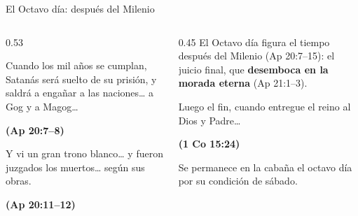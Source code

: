 \documentclass[hyperref={bookmarks=false},aspectratio=169]{beamer}
\newcommand{\fuente}[1]{\par\hfill{\upshape\bfseries\footnotesize\textcolor{tierraroja}{#1}}}
\newcommand{\destacar}[1]{\textbf{\textcolor{tierraroja}{#1}}}
\begin{document}
\begin{frame}{El Octavo día: después del Milenio}
\begin{columns}[t,onlytextwidth]
\begin{column}{0.53\textwidth}
\begin{cita}Cuando los mil años se cumplan, Satanás será suelto de su prisión, y saldrá a engañar a las naciones\ldots{} a Gog y a Magog\ldots\fuente{(Ap 20:7--8)}\end{cita}
\begin{cita}Y vi un gran trono blanco\ldots{} y fueron juzgados los muertos\ldots{} según sus obras.\fuente{(Ap 20:11--12)}\end{cita}
\end{column}
\begin{column}{0.45\textwidth}\small
El Octavo día figura el tiempo después del Milenio (Ap 20:7--15): el juicio final, que \destacar{desemboca en la morada eterna} (Ap 21:1--3).\par\medskip
\begin{cita}Luego el fin, cuando entregue el reino al Dios y Padre\ldots\fuente{(1 Co 15:24)}\end{cita}
\scriptsize Se permanece en la cabaña el octavo día por su condición de sábado.
\end{column}
\end{columns}
\end{frame}
\end{document}
